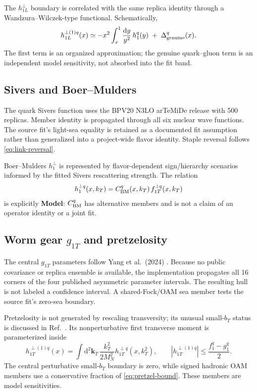 \documentclass[11pt]{article}
\newcommand{\kT}{\bm{k}_{T}}
\newcommand{\dd}{\mathrm{d}}
\newcommand{\status}[1]{\textsf{\textbf{#1}}}
\newcommand{\model}{\status{Model}}
\begin{document}
The \(h_{1L}^{\perp}\) boundary is correlated with the same replica identity
through a Wandzura--Wilczek-type functional.  Schematically,
\begin{equation}
h_{1L}^{\perp(1)q}(x)
\simeq -x^2\int_x^1\frac{\dd y}{y^2}\,h_1^q(y)
\;+\;\Delta_{\rm genuine}^q(x).
\label{eq:ww-h1l}
\end{equation}
The first term is an organized approximation; the genuine quark--gluon
term is an independent model sensitivity, not absorbed into the fit band.

\subsection{Sivers and Boer--Mulders}

The quark Sivers function uses the BPV20 N3LO arTeMiDe release
\cite{BPV20} with 500
replicas.  Member identity is propagated through all six nuclear wave
functions.  The source fit's light-sea equality is retained as a documented
fit assumption rather than generalized into a project-wide flavor
identity.  Staple reversal follows \cref{eq:link-reversal}.

Boer--Mulders \(h_1^\perp\) is represented by flavor-dependent
sign/hierarchy scenarios informed by the fitted Sivers rescattering
strength.  The relation
\begin{equation}
h_1^{\perp q}(x,k_T)
=C_{\rm BM}^q(x,k_T)\,f_{1T}^{\perp q}(x,k_T)
\label{eq:bm-model}
\end{equation}
is explicitly \model: \(C_{\rm BM}^q\) has alternative members and is not a
claim of an operator identity or a joint fit.

\subsection{Worm gear \(g_{1T}\) and pretzelosity}

The central \(g_{1T}\) parameters follow Yang et al.\ (2024)
\cite{Yang2024}.  Because no
public covariance or replica ensemble is available, the implementation
propagates all 16 corners of the four published asymmetric parameter
intervals.  The resulting hull is not labeled a confidence interval.  A
shared-Fock/OAM sea member tests the source fit's zero-sea boundary.

Pretzelosity is not generated by rescaling transversity; its unusual
small-\(b_T\) status is discussed in Ref.~\cite{Pretzel}.  Its
nonperturbative first transverse moment is parameterized inside
\begin{equation}
h_{1T}^{\perp(1)q}(x)
=\int\dd^2\kT\,\frac{k_T^2}{2M_N^2}
h_{1T}^{\perp q}(x,k_T^2),\qquad
\left|h_{1T}^{\perp(1)q}\right|
\leq\frac{f_1^q-g_1^q}{2}.
\label{eq:pretzel-bound}
\end{equation}
The central perturbative small-\(b_T\) boundary is zero, while signed
hadronic OAM members use a conservative fraction of
\cref{eq:pretzel-bound}.  These members are model sensitivities.
\end{document}
